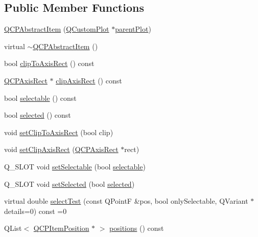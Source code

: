 \subsection*{Public Member Functions}
\begin{DoxyCompactItemize}
\item 
\hyperlink{class_q_c_p_abstract_item_a9922507d8b4503a1fe1ed0b1030e23b6}{Q\+C\+P\+Abstract\+Item} (\hyperlink{class_q_custom_plot}{Q\+Custom\+Plot} $\ast$\hyperlink{class_q_c_p_layerable_ab7e0e94461566093d36ffc0f5312b109}{parent\+Plot})
\item 
virtual \hyperlink{class_q_c_p_abstract_item_a375bd1b7d3218b04a6ff7ff06fff917c}{$\sim$\+Q\+C\+P\+Abstract\+Item} ()
\item 
bool \hyperlink{class_q_c_p_abstract_item_a5b0ea171823033bcb8aee81f4a034871}{clip\+To\+Axis\+Rect} () const 
\item 
\hyperlink{class_q_c_p_axis_rect}{Q\+C\+P\+Axis\+Rect} $\ast$ \hyperlink{class_q_c_p_abstract_item_a37f86618740b5047eae23eedb2de061a}{clip\+Axis\+Rect} () const 
\item 
bool \hyperlink{class_q_c_p_abstract_item_a9189e752025533e1595eaade0009a3bc}{selectable} () const 
\item 
bool \hyperlink{class_q_c_p_abstract_item_a225865808640d8d9a7dd19f09a2e93f2}{selected} () const 
\item 
void \hyperlink{class_q_c_p_abstract_item_a39e05b9d4176b9accafc746d16ca6a06}{set\+Clip\+To\+Axis\+Rect} (bool clip)
\item 
void \hyperlink{class_q_c_p_abstract_item_a7dc75fcbcd10206fe0b75d757ea7a347}{set\+Clip\+Axis\+Rect} (\hyperlink{class_q_c_p_axis_rect}{Q\+C\+P\+Axis\+Rect} $\ast$rect)
\item 
Q\+\_\+\+S\+L\+O\+T void \hyperlink{class_q_c_p_abstract_item_a8a8e32a55bc478b849756a78c2d87fd2}{set\+Selectable} (bool \hyperlink{class_q_c_p_abstract_item_a9189e752025533e1595eaade0009a3bc}{selectable})
\item 
Q\+\_\+\+S\+L\+O\+T void \hyperlink{class_q_c_p_abstract_item_a203de94ad586cc44d16c9565f49d3378}{set\+Selected} (bool \hyperlink{class_q_c_p_abstract_item_a225865808640d8d9a7dd19f09a2e93f2}{selected})
\item 
virtual double \hyperlink{class_q_c_p_abstract_item_a96d522d10ffc0413b9a366c6f7f0476b}{select\+Test} (const Q\+Point\+F \&pos, bool only\+Selectable, Q\+Variant $\ast$details=0) const =0
\item 
Q\+List$<$ \hyperlink{class_q_c_p_item_position}{Q\+C\+P\+Item\+Position} $\ast$ $>$ \hyperlink{class_q_c_p_abstract_item_adf6a680cc29a6bce8345c3b6af3a91a1}{positions} () const 

\end{DoxyCompactItemize}
